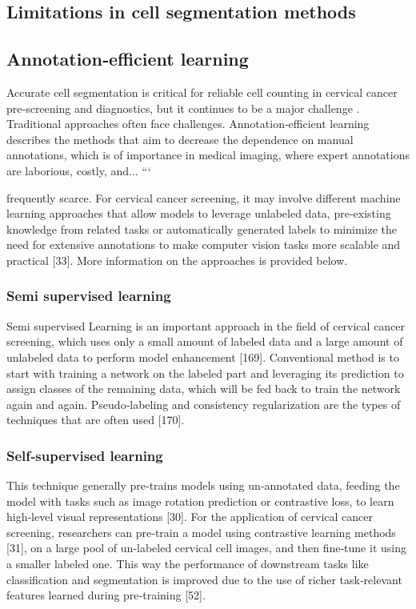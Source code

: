 \documentclass[final,5p,times,twocolumn,authoryear]{elsarticle}
\begin{document}
\subsection{Limitations in cell segmentation methods}
\subsection{Annotation‑efficient learning}
Accurate cell segmentation is critical for reliable cell counting in cervical cancer pre‑screening and diagnostics, but it continues to be a major challenge \cite{ref158}. Traditional approaches often face challenges.
Annotation‑efficient learning describes the methods that aim to decrease the dependence on manual annotations, which is of importance in medical imaging, where expert annotations are laborious, costly, and...
```

frequently scarce. For cervical cancer screening, it may involve different machine learning approaches that allow models to leverage unlabeled data, pre‑existing knowledge from related tasks or automatically generated labels to minimize the need for extensive annotations to make computer vision tasks more scalable and practical [33]. More information on the approaches is provided below.
\subsubsection{Semi supervised learning}
Semi supervised Learning is an important approach in the field of cervical cancer screening, which uses only a small amount of labeled data and a large amount of unlabeled data to perform model enhancement [169]. Conventional method is to start with training a network on the labeled part and leveraging its prediction to assign classes of the remaining data, which will be fed back to train the network again and again. Pseudo‑labeling and consistency regularization are the types of techniques that are often used [170].
\subsubsection{Self‑supervised learning}
This technique generally pre‑trains models using un‑annotated data, feeding the model with tasks such as image rotation prediction or contrastive loss, to learn high‑level visual representations [30]. For the application of cervical cancer screening, researchers can pre‑train a model using contrastive learning methods [31], on a large pool of un‑labeled cervical cell images, and then fine‑tune it using a smaller labeled one. This way the performance of downstream tasks like classification and segmentation is improved due to the use of richer task‑relevant features learned during pre‑training [52].
\end{document}
